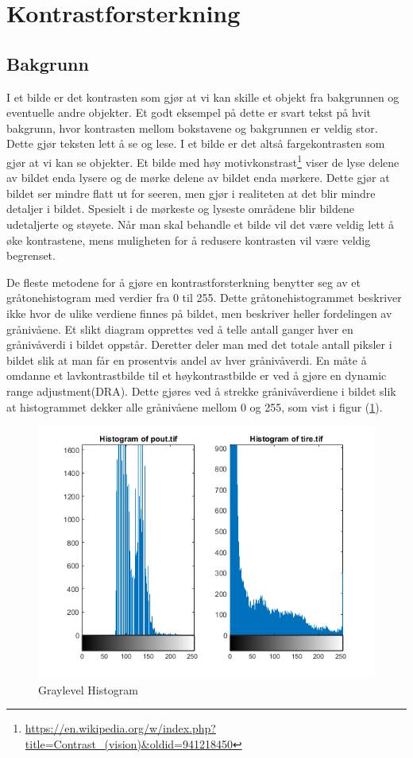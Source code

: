 \newpage
\section{Kontrastforsterkning}
\label{sec:Kontrastforsterkning}
\subsection{Bakgrunn}
I et bilde er det kontrasten som gjør at vi kan skille et objekt fra bakgrunnen og eventuelle andre objekter.\cite{wiki:kontrast} Et godt eksempel på dette er svart tekst på hvit bakgrunn, hvor kontrasten mellom bokstavene og bakgrunnen er veldig stor. Dette gjør teksten lett å se og lese. I et bilde er det altså fargekontrasten som gjør at vi kan se objekter. Et bilde med høy motivkonstrast\footnote{\url{https://en.wikipedia.org/w/index.php?title=Contrast_(vision)&oldid=941218450}} viser de lyse delene av bildet enda lysere og de mørke delene av bildet enda mørkere. Dette gjør at bildet ser mindre flatt ut for seeren, men gjør i realiteten at det blir mindre detaljer i bildet. Spesielt i de mørkeste og lyseste områdene blir bildene udetaljerte og støyete. Når man skal behandle et bilde vil det være veldig lett å øke kontrastene, mens muligheten for å redusere kontrasten vil være veldig begrenset. 

De fleste metodene for å gjøre en kontrastforsterkning benytter seg av et gråtonehistogram med verdier fra 0 til 255. Dette gråtonehistogrammet beskriver ikke hvor de ulike verdiene finnes på bildet, men beskriver heller fordelingen av grånivåene. Et slikt diagram opprettes ved å telle antall ganger hver en grånivåverdi i bildet oppstår. Deretter deler man med det totale antall piksler i bildet slik at man får en prosentvis andel av hver grånivåverdi. En måte å omdanne et lavkontrastbilde til et høykontrastbilde er ved å gjøre en dynamic range adjustment(DRA)\cite{Contrast:Human}. Dette gjøres ved å strekke grånivåverdiene i bildet slik at histogrammet dekker alle grånivåene mellom 0 og 255, som vist i figur (\ref{Figur 2}).

\begin{figure}[H]
\begin{center}
    \includegraphics[width=0.7\columnwidth]{bilder/Kontrastforsterkning/graylevelhistogram.png}
    \caption{Graylevel Histogram \label{Figur 2}} 
\end{center}
\end{figure}
\newpage
